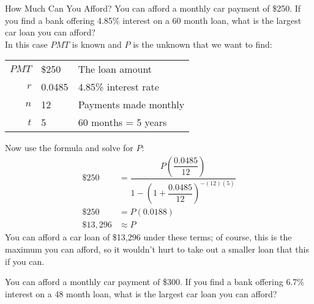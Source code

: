 \begin{example}[https://www.youtube.com/watch?v=ydmN5lt5g20&list=PLfmpjsIzhztsZtnb7HnXrQ8SLoiOCIcAM&index=35]{How Much Can You Afford?}
You can afford a monthly car payment of \$250.  If you find a bank offering 4.85\% interest on a 60 month loan, what is the largest car loan you can afford?\\

\sol
In this case $PMT$ is known and $P$ is the unknown that we want to find:
\begin{center}
\begin{tabular}{r l l}
$PMT$ & \$250 & The loan amount\\
$r$ & 0.0485 & 4.85\% interest rate\\
$n$ & 12 & Payments made monthly\\
$t$ & 5 & 60 months = 5 years
\end{tabular}
\end{center}

Now use the formula and solve for $P$:
\begin{align*}
\$250 &= \dfrac{P\left(\dfrac{0.0485}{12}\right)}{1-\left(1+\dfrac{0.0485}{12}\right)^{-(12)(5)}}\\
\$250 &= P(0.0188)\\
\boxed{\$13,296} &\approx P
\end{align*}
You can afford a car loan of \$13,296 under these terms; of course, this is the maximum you can afford, so it wouldn't hurt to take out a smaller loan that this if you can.
\end{example}

\begin{try}
You can afford a monthly car payment of \$300.  If you find a bank offering 6.7\% interest on a 48 month loan, what is the largest car loan you can afford?
\end{try}

